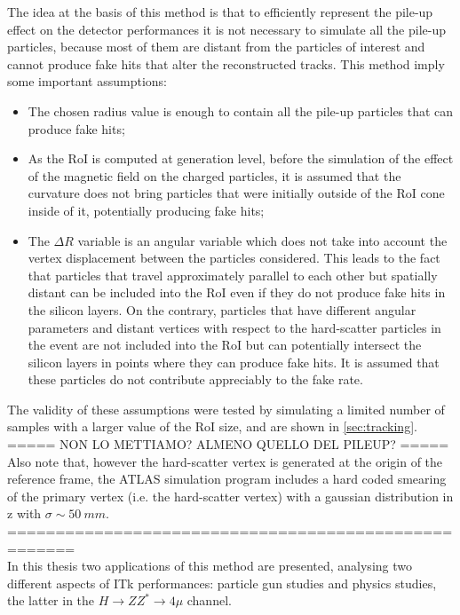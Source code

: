 \documentclass[a4paper,twoside,12pt]{article}
\begin{document}
The idea at the basis of this method is that to efficiently represent the pile-up effect on the
detector performances it is not necessary to simulate all the pile-up particles, because most 
of them are distant from the particles of interest and cannot produce fake hits that 
alter the reconstructed tracks. This 
method imply some important assumptions:
\begin{itemize}
\item The chosen radius value is enough to contain all the pile-up particles that can produce
fake hits;
\item As the RoI is computed at generation level, before the simulation of the effect of the
magnetic field on the charged particles, it is assumed that the curvature does not bring
particles that were initially outside of the RoI cone inside of it, potentially producing fake hits;
\item The $\Delta R$ variable is an angular variable which does not take into account the vertex displacement between the particles considered. This leads to the fact that particles 
that travel approximately parallel to each other but spatially distant can be included into the
RoI even if they do not produce fake hits in the silicon layers. On the contrary, particles that 
have different angular parameters and distant vertices with respect to the hard-scatter
particles in the event are not included into the RoI but can potentially intersect the silicon 
layers in points where they can produce fake hits. It is assumed that these particles do 
not contribute appreciably to the fake rate.
\end{itemize}

The validity of these assumptions were tested by simulating a limited number of samples with
a larger value of the RoI size, and are shown in \ref{sec:tracking}.\\

===== NON LO METTIAMO? ALMENO QUELLO DEL PILEUP? =====\\
Also note that, however the hard-scatter vertex is generated at the origin of the reference
frame, the ATLAS simulation program includes a hard coded smearing of the primary vertex
(i.e. the hard-scatter vertex) with a gaussian distribution in z with $\sigma \sim 50\ mm$.\\
=====================================================\\

In this thesis two applications of this method are presented, analysing two different aspects
of ITk performances: particle gun studies and physics studies, the latter
in the $H \rightarrow ZZ^{*} \rightarrow 4\mu$ channel. \\
\end{document}
